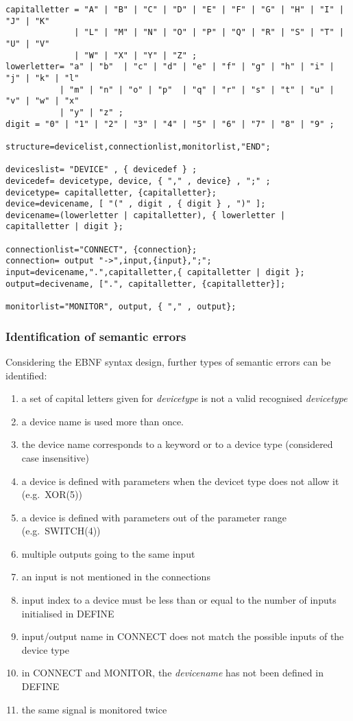 \documentclass[a4paper,11pt]{article}
\providecommand{\tightlist}{%
	\setlength{\itemsep}{0pt}\setlength{\parskip}{0pt}}
\numberwithin{equation}{section}
\begin{document}
\begin{lstlisting}[caption= EBNF of the logic syntax,captionpos=b]
capitalletter = "A" | "B" | "C" | "D" | "E" | "F" | "G" | "H" | "I" | "J" | "K" 
		  	  | "L" | "M" | "N" | "O" | "P" | "Q" | "R" | "S" | "T" | "U" | "V" 
		  	  | "W" | "X" | "Y" | "Z" ;
lowerletter= "a" | "b"	| "c" | "d" | "e" | "f" | "g" | "h" | "i" | "j" | "k" | "l" 
		   | "m" | "n" | "o" | "p"	| "q" | "r" | "s" | "t" | "u" | "v" | "w" | "x" 
		   | "y" | "z" ;
digit = "0" | "1" | "2" | "3" | "4" | "5" | "6" | "7" | "8" | "9" ;

structure=devicelist,connectionlist,monitorlist,"END";

deviceslist= "DEVICE" , { devicedef } ;
devicedef= devicetype, device, { "," , device} , ";" ;
devicetype= capitalletter, {capitalletter};
device=devicename, [ "(" , digit , { digit } , ")" ];
devicename=(lowerletter | capitalletter), { lowerletter | capitalletter | digit };

connectionlist="CONNECT", {connection};
connection= output "->",input,{input},";";
input=devicename,".",capitalletter,{ capitalletter | digit };  
output=decivename, [".", capitalletter, {capitalletter}];

monitorlist="MONITOR", output, { "," , output};
\end{lstlisting}

\subsubsection{Identification of semantic errors} \label{ident_sem_error}
Considering the EBNF syntax design, further types of semantic errors can be identified:
\begin{enumerate}
	\tightlist
	\item a set of capital letters given for \textit{devicetype} is not a valid recognised \textit{devicetype}
	\item a device name is used more than once.
	\item the device name corresponds to a keyword or to a device type (considered case insensitive)
	\item a device is defined with parameters when the devicet type does not allow it (e.g.~XOR(5))
	\item a device is defined with parameters out of the parameter range (e.g.~SWITCH(4))
	\item multiple outputs going to the same input
	\item an input is not mentioned in the connections
	\item input index to a device must be less than or equal to the number of inputs initialised in DEFINE
	\item input/output name in CONNECT does not match the possible inputs of the device type
	\item in CONNECT and MONITOR, the \textit{devicename} has not been defined in DEFINE
	\item the same signal is monitored twice
\end{enumerate}
\end{document}
